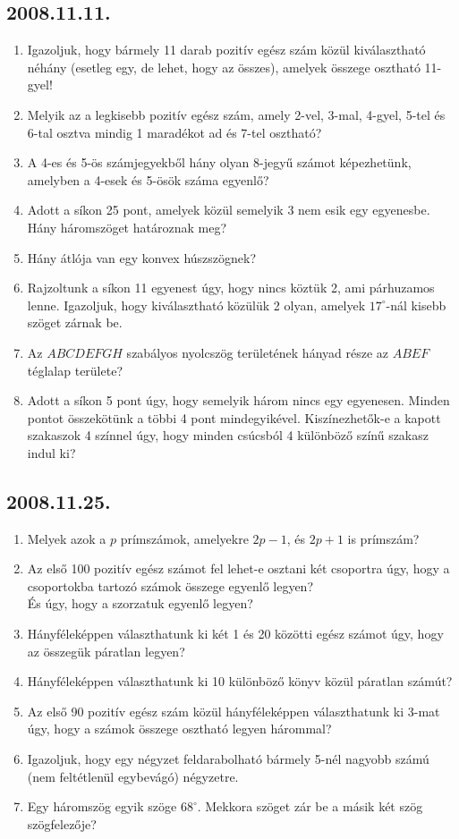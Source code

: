 \subsection*{2008.11.11.}
\begin{enumerate}
\item Igazoljuk, hogy bármely 11 darab pozitív egész szám közül kiválasztható néhány (esetleg egy, de lehet, hogy az összes), amelyek összege osztható 11-gyel! 
\item Melyik az a legkisebb pozitív egész szám, amely 2-vel, 3-mal, 4-gyel, 5-tel és 6-tal osztva mindig 1 maradékot ad és 7-tel osztható?
\item A 4-es és 5-ös számjegyekből hány olyan 8-jegyű számot képezhetünk, amelyben a 4-esek és 5-ösök száma egyenlő?
\item Adott a síkon 25 pont, amelyek közül semelyik 3 nem esik egy egyenesbe. Hány háromszöget határoznak meg?
\item Hány átlója van egy konvex húszszögnek? 
\item Rajzoltunk a síkon 11 egyenest úgy, hogy nincs köztük 2, ami párhuzamos lenne. Igazoljuk, hogy kiválaszt\-ha\-tó közülük 2 olyan, amelyek $17^\circ$-nál kisebb szöget zárnak be.
\item Az $ABCDEFGH$ szabályos nyolcszög területének hányad része az $ABEF$ téglalap területe?
\item Adott a síkon 5 pont úgy, hogy semelyik három nincs egy egyenesen. Minden pontot összekötünk a többi 4 pont mindegyikével. Kiszínezhetők-e a kapott szakaszok 4 színnel úgy, hogy minden csúcsból 4 különböző színű szakasz indul ki?
\end{enumerate}

\subsection*{2008.11.25.}
\begin{enumerate}
\item Melyek azok a $p$ prímszámok, amelyekre $2p-1$, és $2p+1$ is prímszám?
\item Az első 100 pozitív egész számot fel lehet-e osztani két csoportra úgy, hogy a csoportokba tartozó számok összege egyenlő legyen?\\
És úgy, hogy a szorzatuk egyenlő legyen?
\item Hányféleképpen választhatunk ki két 1 és 20 közötti egész számot úgy, hogy az összegük páratlan legyen?
\item Hányféleképpen választhatunk ki 10 különböző könyv közül páratlan számút?
\item Az első 90 pozitív egész szám közül hányféleképpen választhatunk ki 3-mat úgy, hogy a számok összege osztható legyen hárommal?
\item Igazoljuk, hogy egy négyzet feldarabolható bármely 5-nél nagyobb számú (nem feltétlenül egybevágó) négyzetre.
\item Egy háromszög egyik szöge $68^\circ$. Mekkora szöget zár be a másik két szög szögfelezője?
\end{enumerate}

